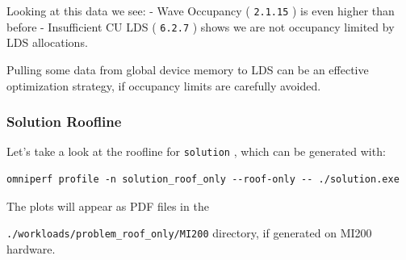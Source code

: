 \documentclass[
]{article}
\let\oldtexttt\texttt
\renewcommand{\texttt}[1]{
  \colorbox{Light}{\oldtexttt{#1}}
}
\begin{document}
Looking at this data we see: - Wave Occupancy (\texttt{2.1.15}) is even
higher than before - Insufficient CU LDS (\texttt{6.2.7}) shows we are
not occupancy limited by LDS allocations.

Pulling some data from global device memory to LDS can be an effective
optimization strategy, if occupancy limits are carefully avoided.

\hypertarget{solution-roofline2}{%
\subsubsection{Solution Roofline}\label{solution-roofline2}}

Let's take a look at the roofline for \texttt{solution}, which can be
generated with:

\begin{verbatim}
omniperf profile -n solution_roof_only --roof-only -- ./solution.exe
\end{verbatim}

The plots will appear as PDF files in the
\texttt{./workloads/problem\_roof\_only/MI200} directory, if generated
on MI200 hardware.
\end{document}
